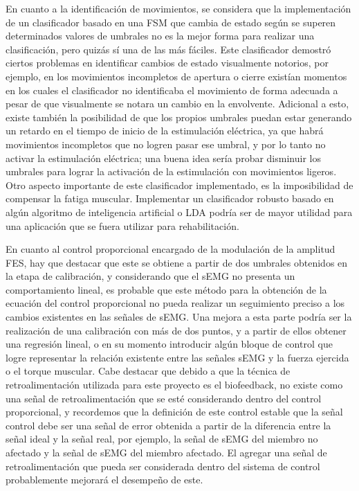 En cuanto a la identificación de movimientos, se considera que la implementación de un clasificador basado en una FSM que cambia de estado según se superen determinados valores de umbrales no es la mejor forma para realizar una clasificación, pero quizás sí una de las más fáciles. Este clasificador demostró ciertos problemas en identificar cambios de estado visualmente notorios, por ejemplo, en los movimientos incompletos de apertura o cierre existían momentos en los cuales el clasificador no identificaba el movimiento de forma adecuada a pesar de que visualmente se notara un cambio en la envolvente. Adicional a esto, existe también la posibilidad de que los propios umbrales puedan estar generando un retardo en el tiempo de inicio de la estimulación eléctrica, ya que habrá movimientos incompletos que no logren pasar ese umbral, y por lo tanto no activar la estimulación eléctrica; una buena idea sería probar disminuir los umbrales para lograr la activación de la estimulación con movimientos ligeros. Otro aspecto importante de este clasificador implementado, es la imposibilidad de compensar la fatiga muscular. Implementar un clasificador robusto basado en algún algoritmo de inteligencia artificial o LDA podría ser de mayor utilidad para una aplicación que se fuera utilizar para rehabilitación.

En cuanto al control proporcional encargado de la modulación de la amplitud FES, hay que destacar que este se obtiene a partir de dos umbrales obtenidos en la etapa de calibración, y considerando que el sEMG no presenta un comportamiento lineal, es probable que este método para la obtención de la ecuación del control proporcional no pueda realizar un seguimiento preciso a los cambios existentes en las señales de sEMG. Una mejora a esta parte podría ser la realización de una calibración con más de dos puntos, y a partir de ellos obtener una regresión lineal, o en su momento introducir algún bloque de control que logre representar la relación existente entre las señales sEMG y la fuerza ejercida o el torque muscular. Cabe destacar que debido a que la técnica de retroalimentación utilizada para este proyecto es el biofeedback, no existe como una señal de retroalimentación que se esté considerando dentro del control proporcional, y recordemos que la definición de este control estable que la señal control debe ser una señal de error obtenida a partir de la diferencia entre la señal ideal y la señal real, por ejemplo, la señal de sEMG del miembro no afectado y la señal de sEMG del miembro afectado. El agregar una señal de retroalimentación que pueda ser considerada dentro del sistema de control probablemente mejorará el desempeño de este.

